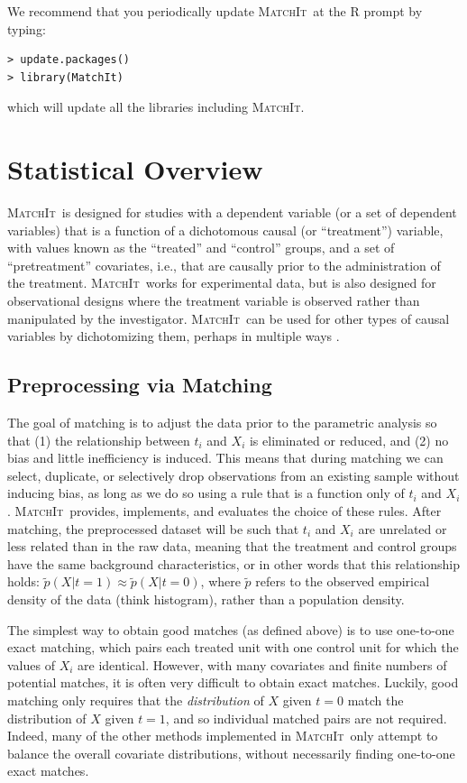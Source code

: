\documentclass[oneside,letterpaper,titlepage]{article}
\newcommand{\MatchIt}{\textsc{MatchIt}}
\begin{document}
We recommend that you periodically update \MatchIt\ at the R prompt by typing:
\begin{verbatim}
> update.packages()
> library(MatchIt) 
\end{verbatim}
which will update all the libraries including \MatchIt.


\section{Statistical Overview}

\MatchIt\ is designed for studies with a dependent variable (or a set
of dependent variables) that is a function of a dichotomous causal (or
``treatment'') variable, with values known as the ``treated'' and
``control'' groups, and a set of ``pretreatment'' covariates, i.e.,
that are causally prior to the administration of the treatment.
\MatchIt\ works for experimental data, but is also designed for
observational designs where the treatment variable is observed rather
than manipulated by the investigator.  \MatchIt\ can be used for other
types of causal variables by dichotomizing them, perhaps in multiple
ways \citep[see also][]{ImaDyk04}.

\subsection{Preprocessing via Matching}

The goal of matching is to adjust the data prior to the parametric
analysis so that (1) the relationship between $t_i$ and $X_i$ is
eliminated or reduced, and (2) no bias and little inefficiency is
induced.  This means that during matching we can select, duplicate, or
selectively drop observations from an existing sample without inducing
bias, as long as we do so using a rule that is a function only of
$t_i$ and $X_i$.  \MatchIt\ provides, implements, and evaluates the
choice of these rules.  After matching, the preprocessed dataset will
be such that $t_i$ and $X_i$ are unrelated or less related than in the
raw data, meaning that the treatment and control groups have the same
background characteristics, or in other words that this relationship
holds: $\tilde p(X|t=1) \approx \tilde p(X|t=0)$, where $\tilde p$
refers to the observed empirical density of the data (think
histogram), rather than a population density.  

The simplest way to obtain good matches (as defined above) is to use one-to-one exact matching,
which pairs each treated unit with one control unit for which the
values of $X_i$ are identical.  However, with many covariates and finite numbers of
potential matches, it is often very difficult to obtain exact matches.  Luckily, good matching only requires that
the \emph{distribution} of $X$ given $t=0$ match the distribution of
$X$ given $t=1$, and so individual matched pairs are not required.
Indeed, many of the other methods implemented in \MatchIt\ only
attempt to balance the overall covariate distributions, without necessarily finding one-to-one exact matches.
\end{document}
